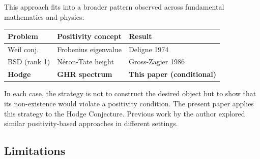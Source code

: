 \documentclass[aps,prd,twocolumn,superscriptaddress,nofootinbib]{revtex4-2}
\theoremstyle{definition}
\theoremstyle{remark}
\begin{document}
This approach fits into a broader pattern observed across fundamental mathematics and physics:

\begin{center}
\begin{tabular}{lll}
\hline
Problem & Positivity concept & Result \\
\hline
Weil conj. & Frobenius eigenvalue & Deligne 1974~\cite{Deligne1974} \\
BSD (rank 1) & N\'eron-Tate height & Gross-Zagier 1986~\cite{GrossZagier1986} \\
\textbf{Hodge} & \textbf{GHR spectrum} & \textbf{This paper (conditional)} \\
\hline
\end{tabular}
\end{center}

In each case, the strategy is not to construct the desired object but to show that its non-existence would violate a positivity condition. The present paper applies this strategy to the Hodge Conjecture. Previous work by the author \cite{GeigerRH2026c, FST-Unified2026} explored similar positivity-based approaches in different settings.

\subsection{Limitations}
\end{document}
